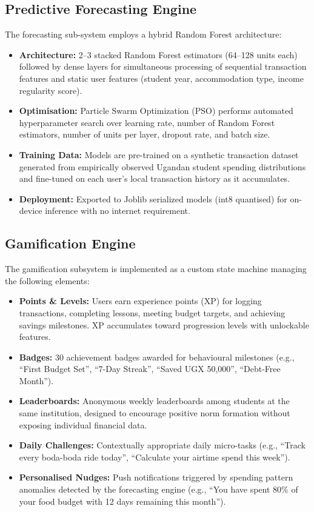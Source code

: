 \documentclass[12pt]{report}
\begin{document}
\subsection{Predictive Forecasting Engine}

The forecasting sub-system employs a hybrid Random Forest architecture:

\begin{itemize}
    \item \textbf{Architecture:} 2--3 stacked Random Forest estimators (64--128 units each) followed by dense layers for simultaneous processing of sequential transaction features and static user features (student year, accommodation type, income regularity score).
    \item \textbf{Optimisation:} Particle Swarm Optimization (PSO) performs automated hyperparameter search over learning rate, number of Random Forest estimators, number of units per layer, dropout rate, and batch size.
    \item \textbf{Training Data:} Models are pre-trained on a synthetic transaction dataset generated from empirically observed Ugandan student spending distributions and fine-tuned on each user's local transaction history as it accumulates.
    \item \textbf{Deployment:} Exported to Joblib serialized models (int8 quantised) for on-device inference with no internet requirement.
\end{itemize}

\subsection{Gamification Engine}

The gamification subsystem is implemented as a custom state machine managing the
following elements:

\begin{itemize}
    \item \textbf{Points \& Levels:} Users earn experience points (XP) for logging transactions, completing lessons, meeting budget targets, and achieving savings milestones. XP accumulates toward progression levels with unlockable features.
    \item \textbf{Badges:} 30 achievement badges awarded for behavioural milestones (e.g., ``First Budget Set'', ``7-Day Streak'', ``Saved UGX 50,000'', ``Debt-Free Month'').
    \item \textbf{Leaderboards:} Anonymous weekly leaderboards among students at the same institution, designed to encourage positive norm formation without exposing individual financial data.
    \item \textbf{Daily Challenges:} Contextually appropriate daily micro-tasks (e.g., ``Track every boda-boda ride today'', ``Calculate your airtime spend this week'').
    \item \textbf{Personalised Nudges:} Push notifications triggered by spending pattern anomalies detected by the forecasting engine (e.g., ``You have spent 80\% of your food budget with 12 days remaining this month'').
\end{itemize}
\end{document}

